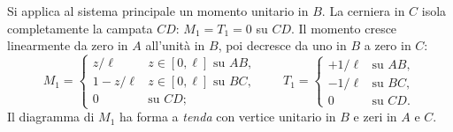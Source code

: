 Si applica al sistema principale un momento unitario
in $B$. La cerniera in $C$ isola completamente la
campata $CD$: $M_1 = T_1 = 0$ su $CD$.
Il momento cresce linearmente da zero in $A$ all'unità
in $B$, poi decresce da uno in $B$ a zero in $C$:
\[
M_1 = \begin{cases}
z/\ell & z \in [0,\ell] \text{ su } AB, \\[4pt]
1 - z/\ell & z \in [0,\ell] \text{ su } BC, \\[4pt]
0 & \text{su } CD;
\end{cases}
\qquad
T_1 = \begin{cases}
+1/\ell & \text{su } AB, \\[4pt]
-1/\ell & \text{su } BC, \\[4pt]
0 & \text{su } CD.
\end{cases}
\]
Il diagramma di $M_1$ ha forma a \emph{tenda} con vertice
unitario in $B$ e zeri in $A$ e $C$.
